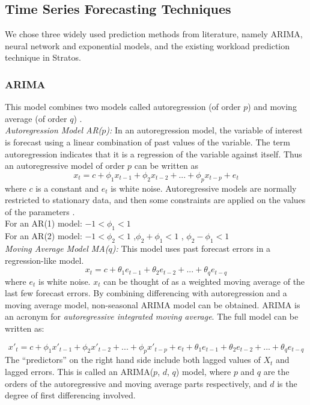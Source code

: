 \subsection{Time Series Forecasting Techniques}
We chose three widely used prediction methods from literature, namely ARIMA, neural network and exponential models, and the existing workload prediction technique in Stratos.

\subsubsection{ARIMA}
This model combines two models called autoregression (of order $p$) and moving average (of order $q$) .\\

\noindent
\textit{Autoregression Model AR($p$):}
In an autoregression model, the variable of interest is forecast using a linear combination of past values of the variable. The term autoregression indicates that it is a regression of the variable against itself. Thus an autoregressive model of order $p$ can be written as
	$$x_t = c + \phi_1x_{ t-1} + \phi_2x_{t-2} +...+ \phi_px_{t-p} + e_{t}$$
where $c$ is a constant and $e_t$ is white noise. Autoregressive models are normally restricted to stationary data, and then some constraints are applied on the values of the parameters \cite{Forecasting_OTexts}. \\
For an AR(1) model: $-1 < \phi_{1} < 1$ \\
For an AR(2) model: $-1 < \phi_{2} < 1$ ,$\phi_{2}+ \phi_{1} < 1$ , $\phi_{2} - \phi_{1} < 1$ \\

\noindent
\textit{Moving Average Model MA($q$):}
This model uses past forecast errors in a regression-like model.
	$$x_t =  c + \theta_1e_{ t-1} + \theta_2e_{t-2} +...+ \theta_qe_{t-q}$$
where $e_t$ is white noise. $x_t$ can be thought of as a weighted moving average of the last few forecast errors. 
By combining differencing with autoregression and a moving average model, non-seasonal ARIMA model can be obtained. ARIMA is an acronym for \textit{autoregressive integrated moving average}. The full model can be written as:

	$${x}'_t = c + \phi_1{x}'_{ t-1} + \phi_2{x}'_{t-2} +...+ \phi_p{x}'_{t-p} + e_{t} + \theta_1e_{ t-1} + \theta_2e_{t-2} +...+ \theta_qe_{t-q}$$
The “predictors” on the right hand side include both lagged values of $X_t$ and lagged errors. This is called an ARIMA($p$, $d$, $q$) model, where $p$ and $q$ are the orders of the autoregressive and moving average parts respectively, and $d$ is the degree of first differencing involved.

